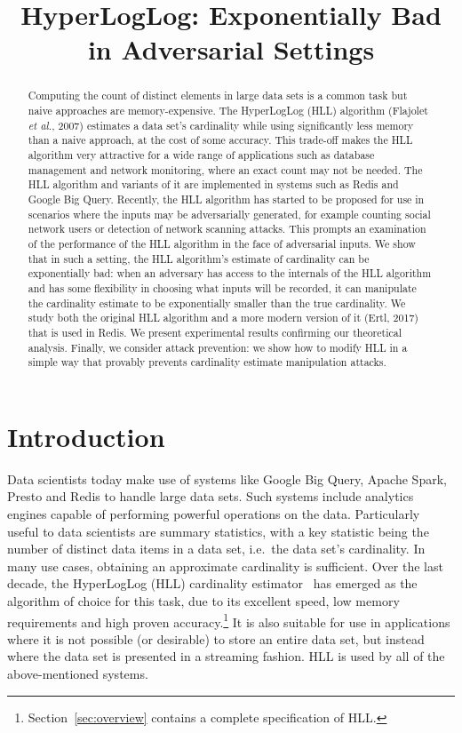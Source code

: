 \documentclass[sigconf, anonymous, dvipsnames]{acmart} %
\title{HyperLogLog: Exponentially Bad in Adversarial Settings}
\begin{document}
\begin{abstract}
Computing the count of distinct elements in large data sets is a common task but naive approaches are memory-expensive. The HyperLogLog (HLL) algorithm (Flajolet \emph{et al.}, 2007) estimates a data set's cardinality while using significantly less memory than a naive approach, at the cost of some accuracy. This trade-off makes the HLL algorithm very attractive for a wide range of applications such as database management and network monitoring, where an exact count may not be needed. The HLL algorithm and variants of it are implemented in systems such as Redis and Google Big Query. Recently, the HLL algorithm has started to be proposed for use in scenarios where the inputs may be adversarially generated, for example counting social network users or detection of network scanning attacks. This prompts an examination of the performance of the HLL algorithm in the face of adversarial inputs. We show that in such a setting, the HLL algorithm's estimate of cardinality can be exponentially bad: when an adversary has access to the internals of the HLL algorithm and has some flexibility in choosing what inputs will be recorded, it can manipulate the cardinality estimate to be exponentially smaller than the true cardinality. We study both the original HLL algorithm and a more modern version of it (Ertl, 2017) that is used in Redis. We present experimental results confirming our theoretical analysis. Finally, we consider attack prevention: we show how to modify HLL in a simple way that provably prevents cardinality estimate manipulation attacks.
\end{abstract}

\maketitle

\section{Introduction}
Data scientists today make use of systems like Google Big Query, Apache Spark, Presto and Redis to handle large data sets. Such systems include analytics engines capable of performing powerful operations on the data. Particularly useful to data scientists are summary statistics, with a key statistic being the number of distinct data items in a data set, i.e.\ the data set's cardinality. In many use cases, obtaining an approximate cardinality is sufficient. Over the last decade, the HyperLogLog (HLL) cardinality estimator~\cite{hll} has emerged as the algorithm of choice for this task, due to its excellent speed, low memory requirements and high proven accuracy.\footnote{Section~\ref{sec:overview} contains a complete specification of HLL.} It is also suitable for use in applications where it is not possible (or desirable) to store an entire data set, but instead where the data set is presented in a streaming fashion. HLL is used by all of the above-mentioned systems.
\end{document}

